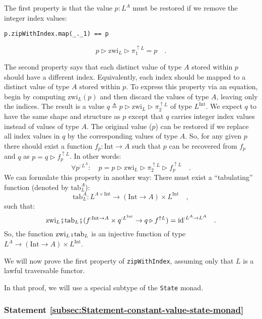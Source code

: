 The first property is that the value $p:L^{A}$ must be restored if
we remove the integer index values:
\begin{lstlisting}
p.zipWithIndex.map(_._1) == p
\end{lstlisting}
\[
p\triangleright\text{zwi}_{L}\triangleright\pi_{1}^{\uparrow L}=p\quad.
\]

The second property says that each distinct value of type $A$ stored
within $p$ should have a different index. Equivalently, each index
should be mapped to a distinct value of type $A$ stored within $p$.
To express this property via an equation, begin by computing $\text{zwi}_{L}(p)$
and then discard the values of type $A$, leaving only the indices.
The result is a value $q\triangleq p\triangleright\text{zwi}_{L}\triangleright\pi_{2}^{\uparrow L}$
of type $L^{\text{Int}}$. We expect $q$ to have the same shape and
structure as $p$ except that $q$ carries integer index values instead
of values of type $A$. The original value ($p$) can be restored
if we replace all index values in $q$ by the corresponding values
of type $A$. So, for any given $p$ there should exist a function
$f_{p}:\text{Int}\rightarrow A$ such that $p$ can be recovered from
$f_{p}$ and $q$ as $p=q\triangleright f_{p}^{\uparrow L}$. In other
words:
\[
\forall p^{:L^{A}}:\quad p=p\triangleright\text{zwi}_{L}\triangleright\pi_{2}^{\uparrow L}\triangleright f_{p}^{\uparrow L}\quad.
\]
We can formulate this property in another way: There must exist a
\textsf{``}tabulating\textsf{''} function (denoted by $\text{tab}_{L}^{A}$):
\[
\text{tab}_{L}^{A}:L^{A\times\text{Int}}\rightarrow(\text{Int}\rightarrow A)\times L^{\text{Int}}\quad,
\]
such that:
\[
\text{zwi}_{L}\bef\text{tab}_{L}\bef(f^{:\text{Int}\rightarrow A}\times q^{:L^{\text{Int}}}\rightarrow q\triangleright f^{\uparrow L})=\text{id}^{:L^{A}\rightarrow L^{A}}\quad.
\]
So, the function $\text{zwi}_{L}\bef\text{tab}_{L}$ is an injective
function of type $L^{A}\rightarrow(\text{Int}\rightarrow A)\times L^{\text{Int}}$.

We will now prove the first property of \lstinline!zipWithIndex!,
assuming only that $L$ is a lawful traversable functor.

In that proof, we will use a special subtype of the \lstinline!State!
monad.

\subsubsection{Statement \label{subsec:Statement-constant-value-state-monad}\ref{subsec:Statement-constant-value-state-monad}}

